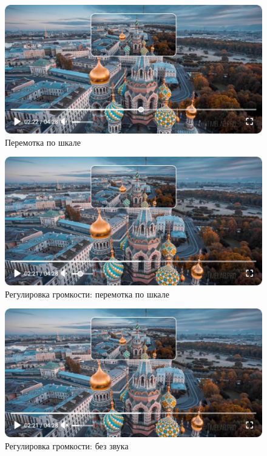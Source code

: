 	\begin{figure}[ht!]
		\center
		\includegraphics [scale=0.37] {my_folder/images//player_seek}
		\caption{Перемотка по шкале} 
		\label{fig:player_seek}
	\end{figure}

	\begin{figure}[ht!]
		\center
		\includegraphics [scale=0.37] {my_folder/images//player_volume_seek}
		\caption{Регулировка громкости: перемотка по шкале} 
		\label{fig:player_volume_seek}
	\end{figure}

	\begin{figure}[ht!]
		\center
		\includegraphics [scale=0.37] {my_folder/images//player_volume_mute}
		\caption{Регулировка громкости: без звука} 
		\label{fig:player_volume_mute}
	\end{figure}
	

